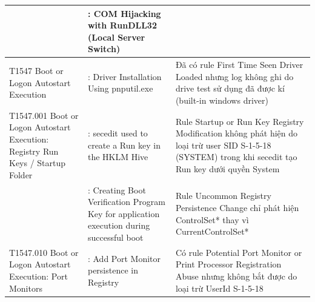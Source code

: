 \begin{longtable}{|>{\raggedright\arraybackslash}p{3.2cm}|>{\raggedright\arraybackslash}p{5.5cm}|>{\raggedright\arraybackslash}p{5.8cm}|}
\cline{2-2}
 & 3: COM Hijacking with RunDLL32 (Local Server Switch) &  \\
\hline
T1547 Boot or Logon Autostart Execution & 2: Driver Installation Using pnputil.exe & Đã có rule First Time Seen Driver Loaded nhưng log không ghi do drive test sử dụng đã được kí (built-in windows driver) \\
\hline
T1547.001 Boot or Logon Autostart Execution: Registry Run Keys / Startup Folder & 16: secedit used to create a Run key in the HKLM Hive & Rule Startup or Run Key Registry Modification không phát hiện do loại trừ user SID S-1-5-18 (SYSTEM) trong khi secedit tạo Run key dưới quyền System \\*
\cline{2-3}
 & 19: Creating Boot Verification Program Key for application execution during successful boot & Rule Uncommon Registry Persistence Change chỉ phát hiện ControlSet* thay vì CurrentControlSet* \\
\hline
T1547.010 Boot or Logon Autostart Execution: Port Monitors & 1: Add Port Monitor persistence in Registry & Có rule Potential Port Monitor or Print Processor Registration Abuse nhưng không bắt được do loại trừ UserId S-1-5-18 \\
\hline
\end{longtable}
\endgroup
